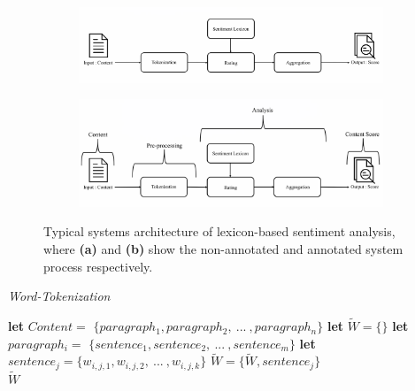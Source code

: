 \begin{figure}
\centering
\begin{subfigure}[b]{.50\textwidth}
   \includegraphics[width=1\linewidth]{img/lexicon-arch-1.png}
   \caption{}
   \label{fig:Ng1} 
\end{subfigure}

\begin{subfigure}[b]{.50\textwidth}
   \includegraphics[width=1\linewidth]{img/lexicon-arch-2.png}
   \caption{}
   \label{fig:Ng2}
\end{subfigure}

\caption[sentimentanalysisarchitecture]{Typical systems architecture of lexicon-based sentiment analysis, where \textbf{(a)} and \textbf{(b)} show the non-annotated and annotated system process respectively.}
\end{figure}

\begin{algorithm}[H]
\caption{\textit{Word-Tokenization}}
\label{array-sum}
\begin{algorithmic}[1]
\State \textbf{let} $Content = $ {\scriptsize{$\lbrace paragraph_1, paragraph_2, \ ... \ , paragraph_n \rbrace$}} 
\State \textbf{let} $\tilde{W} = \lbrace \rbrace$
    \State \textbf{let} $paragraph_i = $ {\scriptsize{$\lbrace sentence_1, sentence_2, \ ...\ , sentence_m \rbrace$}}
        \State \textbf{let} $sentence_j = \lbrace w_{i,j,1}, w_{i,j,2}, \ ...\ , w_{i,j,k} \rbrace$
        \State $\tilde{W} = \lbrace \tilde{W}, sentence_j \rbrace$
    \EndFor
\EndFor \\
\Return $\tilde{W}$
\EndFunction
\end{algorithmic}
\end{algorithm}

